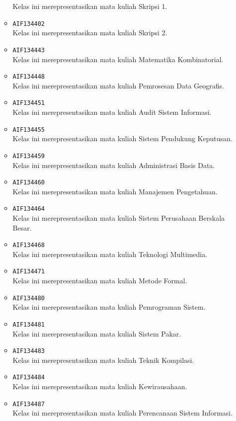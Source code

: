 \begin{enumerate}
\begin{itemize}
Kelas ini merepresentasikan mata kuliah Skripsi 1.
\item \texttt{AIF134402} \\
Kelas ini merepresentasikan mata kuliah Skripsi 2.
\item \texttt{AIF134443} \\
Kelas ini merepresentasikan mata kuliah Matematika Kombinatorial.
\item \texttt{AIF134448} \\
Kelas ini merepresentasikan mata kuliah Pemrosesan Data Geografis.
\item \texttt{AIF134451} \\
Kelas ini merepresentasikan mata kuliah Audit Sistem Informasi.
\item \texttt{AIF134455} \\
Kelas ini merepresentasikan mata kuliah Sistem Pendukung Keputusan.
\item \texttt{AIF134459} \\
Kelas ini merepresentasikan mata kuliah Administrasi Basis Data.
\item \texttt{AIF134460} \\
Kelas ini merepresentasikan mata kuliah Manajemen Pengetahuan.
\item \texttt{AIF134464} \\
Kelas ini merepresentasikan mata kuliah Sistem Perusahaan Berskala Besar.
\item \texttt{AIF134468} \\
Kelas ini merepresentasikan mata kuliah Teknologi Multimedia.
\item \texttt{AIF134471} \\
Kelas ini merepresentasikan mata kuliah Metode Formal.
\item \texttt{AIF134480} \\
Kelas ini merepresentasikan mata kuliah Pemrograman Sistem.
\item \texttt{AIF134481} \\
Kelas ini merepresentasikan mata kuliah Sistem Pakar.
\item \texttt{AIF134483} \\
Kelas ini merepresentasikan mata kuliah Teknik Kompilasi.
\item \texttt{AIF134484} \\
Kelas ini merepresentasikan mata kuliah Kewirausahaan.
\item \texttt{AIF134487} \\
Kelas ini merepresentasikan mata kuliah Perencanaan Sistem Informasi.

\end{itemize}
\end{enumerate}
